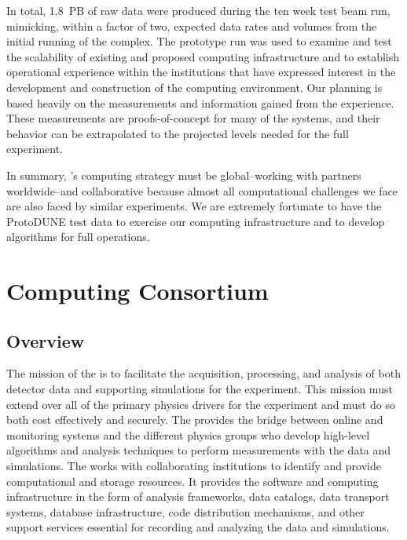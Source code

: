 In total, \SI{1.8}{PB} of raw data were produced during the ten week test beam run, mimicking, within a factor of two, expected data rates and volumes from the initial running of the  complex.  The prototype run was used to examine and test the scalability of existing and proposed computing infrastructure and to establish operational experience within the institutions that have expressed interest in the development and construction of the  computing environment.  Our planning is based heavily on the measurements and information gained from the  experience.   These measurements are proofs-of-concept for many of the systems, and their behavior can be extrapolated to the projected levels needed for the full  experiment. 



In summary, 's computing strategy must be global--working with partners worldwide--and collaborative because almost all computational challenges we face are also %
faced by similar experiments.  We are extremely fortunate to have the ProtoDUNE test data to exercise our computing infrastructure and to develop algorithms for  full  operations.
 
\section{Computing Consortium}
\subsection{Overview}
\label{ch:exec-comp-ovr}

The mission of the  %
 is to facilitate the acquisition, processing, and analysis of both detector data and supporting simulations for the %
experiment.  This mission must extend over all of the primary physics drivers for the experiment and must do so both cost effectively and securely. The  provides the bridge between  online  and monitoring systems and the different physics groups who develop high-level algorithms and analysis techniques to perform measurements with the  data and simulations. The  works with collaborating institutions to identify and provide computational and storage resources.  %
It provides the software and computing infrastructure in the form of analysis frameworks, data catalogs, data transport systems, database infrastructure, code distribution mechanisms, and other support services essential for recording and analyzing the data and simulations. 

